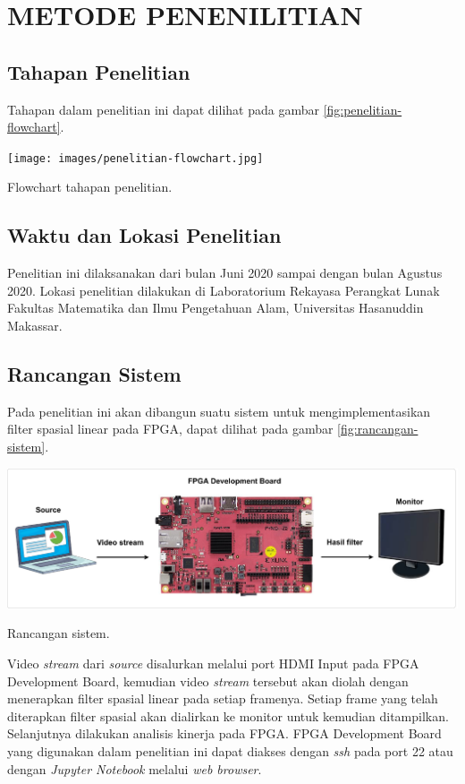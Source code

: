 
\chapter{METODE PENENILITIAN}


\section{Tahapan Penelitian}
Tahapan dalam penelitian ini dapat dilihat pada gambar \ref{fig:penelitian-flowchart}.
\begin{afigure}
    \texttt{[image: images/penelitian-flowchart.jpg]}
    \caption{Flowchart tahapan penelitian.}
    \label{fig:penelitian-flowchart}
\end{afigure}


\section{Waktu dan Lokasi Penelitian}
Penelitian ini dilaksanakan dari bulan Juni 2020 sampai dengan bulan Agustus 2020. Lokasi penelitian dilakukan di Laboratorium Rekayasa Perangkat Lunak Fakultas Matematika dan Ilmu Pengetahuan Alam, Universitas Hasanuddin Makassar.

\section{Rancangan Sistem}
Pada penelitian ini akan dibangun suatu sistem untuk mengimplementasikan filter spasial linear pada FPGA, dapat dilihat pada gambar \ref{fig:rancangan-sistem}.
\begin{afigure}
    \includegraphics[width=1\textwidth, center]{images/rancangan-sistem2.png}
    \caption{Rancangan sistem.}
    \label{fig:rancangan-sistem}
\end{afigure}

Video \textit{stream} dari \textit{source} disalurkan melalui port HDMI Input pada FPGA Development Board, kemudian video \textit{stream} tersebut akan diolah dengan menerapkan filter spasial linear pada setiap framenya. Setiap frame yang telah diterapkan filter spasial akan dialirkan ke monitor untuk kemudian ditampilkan. Selanjutnya dilakukan analisis kinerja pada FPGA. FPGA Development Board yang digunakan dalam penelitian ini dapat diakses dengan \textit{ssh} pada port 22 atau dengan \textit{Jupyter Notebook} melalui \textit{web browser}.

